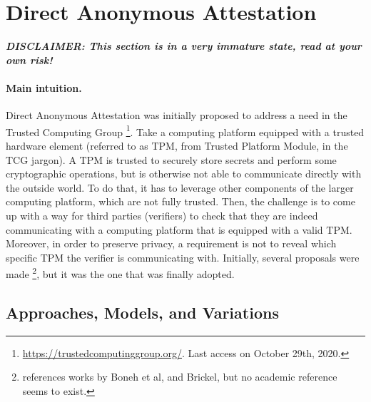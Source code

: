 \section{Direct Anonymous Attestation}
\label{sec:daa}

{\bf \em DISCLAIMER: This section is in a very immature state, read at your
  own risk!}


\paragraph{Main intuition.}
%
Direct Anonymous Attestation \cite{bcc04} was initially proposed to address a
need in the Trusted Computing Group
\footnote{\url{https://trustedcomputinggroup.org/}. Last access on October 29th,
  2020.}. Take a computing platform equipped with a trusted hardware element
(referred to as TPM, from Trusted Platform Module, in the TCG jargon). A TPM
is trusted to securely store secrets and perform some cryptographic operations,
but is otherwise not able to communicate directly with the outside world. To
do that, it has to leverage other components of the larger computing platform,
which are not fully trusted. Then, the challenge is to come up with a way for
third parties (verifiers) to check that they are indeed communicating with a
computing platform that is equipped with a valid TPM. Moreover, in order to
preserve privacy, a requirement is not to reveal which specific TPM the
verifier is communicating with. Initially, several proposals were made
\needcite\footnote{\cite{bcc04} references works by Boneh et al, and Brickel,
  but no academic reference seems to exist.}, but it was \cite{bcc04} the one
that was finally adopted.

\subsection{Approaches, Models, and Variations}
\label{ssec:daaapproach}

